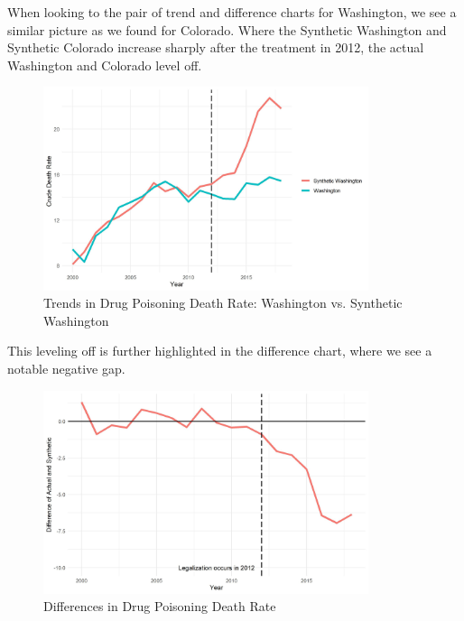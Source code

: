 \documentclass{article}
\begin{document}
When looking to the pair of trend and difference charts for Washington, we see a similar picture as we found for Colorado. Where the Synthetic Washington and Synthetic Colorado increase sharply after the treatment in 2012, the actual Washington and Colorado level off.

\begin{figure}[H]
	\begin{center}
		\includegraphics[width=0.85\textwidth]{trends_plot_washington}
	\end{center}
	\caption{Trends in Drug Poisoning Death Rate: Washington vs. Synthetic Washington}
	\label{fig:trends_plot_washington}
\end{figure}

This leveling off is further highlighted in the difference chart, where we see a notable negative gap.

\begin{figure}[H]
	\begin{center}
		\includegraphics[width=0.85\textwidth]{diffs_plot_washington}
	\end{center}
	\caption{Differences in Drug Poisoning Death Rate}
	\label{fig:diffs_plot_washington}
\end{figure}
\end{document}
